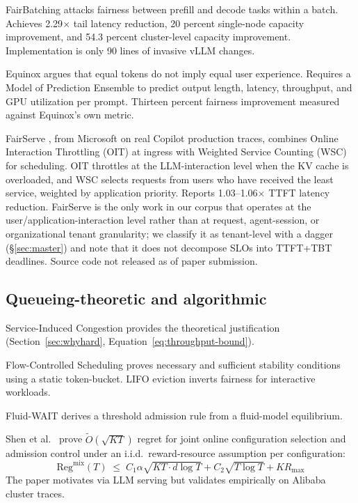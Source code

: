 FairBatching \citep{lyu2025fairbatching} attacks fairness between
prefill and decode tasks within a batch. Achieves 2.29$\times$ tail
latency reduction, 20 percent single-node capacity improvement, and
54.3 percent cluster-level capacity improvement. Implementation is
only 90 lines of invasive vLLM changes.

Equinox \citep{wei2025equinox} argues that equal tokens do not imply
equal user experience. Requires a Model of Prediction Ensemble to
predict output length, latency, throughput, and GPU utilization per
prompt. Thirteen percent fairness improvement measured against
Equinox's own metric.

FairServe \citep{khan2024fairserve}, from Microsoft on real Copilot
production traces, combines Online Interaction Throttling (OIT) at
ingress with Weighted Service Counting (WSC) for scheduling. OIT
throttles at the LLM-interaction level when the KV cache is
overloaded, and WSC selects requests from users who have received
the least service, weighted by application priority. Reports
1.03--1.06$\times$ TTFT latency reduction. FairServe is the only
work in our corpus that operates at the user/application-interaction
level rather than at request, agent-session, or organizational
tenant granularity; we classify it as tenant-level with a dagger
(\S\ref{sec:master}) and note that it does not decompose SLOs into
TTFT+TBT deadlines. Source code not released as of paper
submission.

\subsection{Queueing-theoretic and algorithmic}

Service-Induced Congestion \citep{ao2026sic} provides the theoretical
justification (Section~\ref{sec:whyhard},
Equation~\ref{eq:throughput-bound}).

Flow-Controlled Scheduling \citep{dong2026flowcontrolled} proves
necessary and sufficient stability conditions using a static
token-bucket. LIFO eviction inverts fairness for interactive
workloads.

Fluid-WAIT \citep{ao2025fluidwait} derives a threshold admission rule
from a fluid-model equilibrium.

Shen et al.\ \citep{shen2026twolayer} prove $\tilde{O}(\sqrt{K T})$
regret for joint online configuration selection and admission control
under an i.i.d.\ reward-resource assumption per configuration:
%
\begin{equation}
\text{Reg}^{\text{mix}}(T) \;\le\; C_1 \alpha \sqrt{K T \cdot d \log T} + C_2 \sqrt{T \log T} + K R_{\max}
\label{eq:shen-regret}
\end{equation}
%
The paper motivates via LLM serving but validates empirically on
Alibaba cluster traces.

